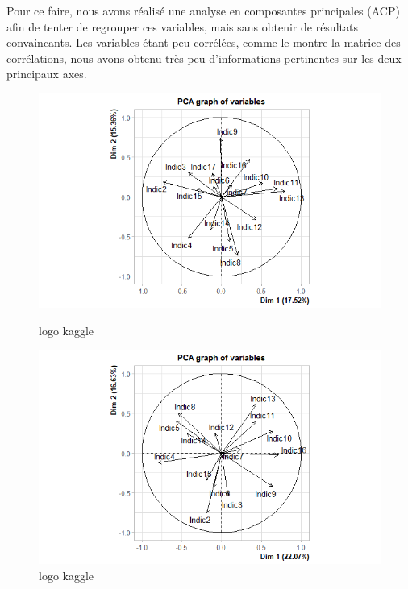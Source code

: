 \documentclass{article}
\begin{document}
Pour ce faire, nous avons réalisé une analyse en composantes principales (ACP) afin de tenter de regrouper ces variables, mais sans obtenir de résultats convaincants. Les variables étant peu corrélées, comme le montre la matrice des corrélations, nous avons obtenu très peu d'informations pertinentes sur les deux principaux axes.

\vspace{2cm}
\begin{figure}[h]
    \centering
    \begin{minipage}{0.48\textwidth}
        \includegraphics[width=\linewidth]{ACP_Na_sup.png}
        \caption{logo kaggle}
        \label{fig:kaggle1}
    \end{minipage}\hfill
    \begin{minipage}{0.48\textwidth}
        \includegraphics[width=\linewidth]{ACP_Moyenne.png}
        \caption{logo kaggle}
        \label{fig:kaggle2}
    \end{minipage}
\end{figure}
\end{document}
